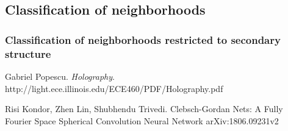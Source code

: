 \documentclass{article}
\begin{document}
\subsection{Classification of neighborhoods}

\subsubsection{Classification of neighborhoods restricted to secondary structure}

\begin{thebibliography}{}
Gabriel Popescu. 
\textit{Holography}.
http://light.ece.illinois.edu/ECE460/PDF/Holography.pdf

Risi Kondor, Zhen Lin, Shubhendu Trivedi.
Clebsch-Gordan Nets: A Fully Fourier Space Spherical Convolution Neural Network
arXiv:1806.09231v2
\end{thebibliography}
\end{document}
